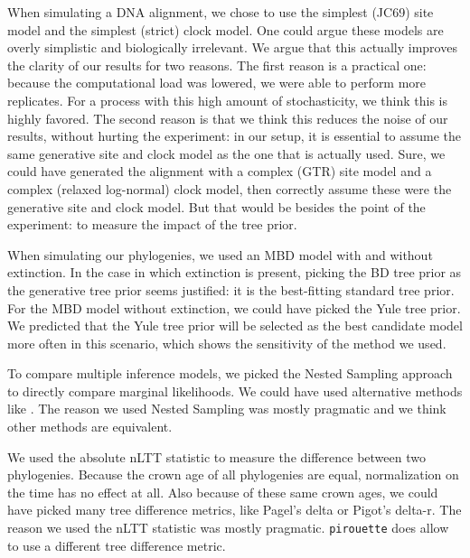 \iffalse %
When simulating a DNA alignment, we chose to use the simplest (JC69) site
model and the simplest (strict) clock model. One could argue these models
are overly simplistic and biologically irrelevant. We argue that this
actually improves the clarity of our results for two reasons. The first
reason is a practical one: because the computational load was lowered,
we were able to perform more replicates. For a process with this high
amount of stochasticity, we think this is highly favored. The second reason
is that we think this reduces the noise of our results, without 
hurting the experiment: in our setup, it is essential
to assume the same generative site and clock model as the one that is actually 
used. Sure, we could have generated the alignment with a 
complex (GTR) site model and a complex (relaxed log-normal) clock model, then
correctly assume these were the generative site and clock model.
But that would be besides the point of the experiment: to measure the impact
of the tree prior.

When simulating our phylogenies, we used an MBD model with and without
extinction. In the case in which extinction is present,
picking the BD tree prior as the generative tree prior seems justified:
it is the best-fitting standard tree prior. For the MBD model without
extinction,  
we could have picked the Yule tree prior. We  predicted
that the Yule tree prior will be selected as the best candidate model
more often in this scenario, which shows the sensitivity of the method we used.

To compare multiple inference models, we picked the Nested Sampling
approach to directly compare marginal likelihoods. We could have used
alternative methods like . The reason we used Nested
Sampling was mostly pragmatic and we think other methods are equivalent.

We used the absolute nLTT statistic to measure the difference between
two phylogenies. Because the crown age of all phylogenies are equal,
normalization on the time has no effect at all. Also because of these
same crown ages, we could have picked many tree difference metrics, like
 Pagel's delta or Pigot's delta-r. The reason we used
the nLTT statistic was mostly pragmatic. \verb;pirouette; does allow to 
use a different tree difference metric.

